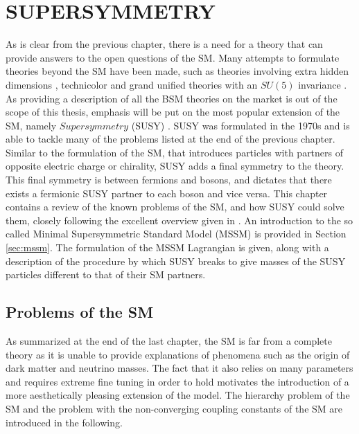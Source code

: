 \chapter{SUPERSYMMETRY} \label{sec:susy}
\noindent\justify
As is clear from the previous chapter, there is a need for a theory that can provide answers to the open questions of the SM. 
Many attempts to formulate theories beyond the SM have been made, such as theories involving extra hidden dimensions \cite{ArkaniHamed:1998rs}, technicolor \cite{Hill:2002ap} and grand unified theories with an $SU(5)$ invariance \cite{Georgi:1974sy}.
As providing a description of all the BSM theories on the market is out of the scope of this thesis, emphasis will be put on the most popular extension of the SM, namely $Supersymmetry$ (SUSY) \cite{Wess:1973kz, Fayet:1974pd, Nilles:1983ge}. 
SUSY was formulated in the 1970s and is able to tackle many of the problems listed at the end of the previous chapter. 
Similar to the formulation of the SM, that introduces particles with partners of opposite electric charge or chirality, SUSY adds a final symmetry to the theory. 
This final symmetry is between fermions and bosons, and dictates that there exists a fermionic SUSY partner to each boson and vice versa. 
\newpara
\noindent\justify
This chapter contains a review of the known problems of the SM, and how SUSY could solve them, closely following the excellent overview given in \cite{Martin:1997ns}. 
An introduction to the so called Minimal Supersymmetric Standard Model (MSSM) is provided in Section \ref{sec:mssm}. 
The formulation of the MSSM Lagrangian is given, along with a description of the procedure by which SUSY breaks to give masses of the SUSY particles different to that of their SM partners. 
\newpage
\section{Problems of the SM}
\noindent\justify
As summarized at the end of the last chapter, the SM is far from a complete theory as it is unable to provide explanations of phenomena such as the origin of dark matter and neutrino masses. 
The fact that it also relies on many parameters and requires extreme fine tuning in order to hold motivates the introduction of a more aesthetically pleasing extension of the model. 
The hierarchy problem of the SM and the problem with the non-converging coupling constants of the SM are introduced in the following. 
